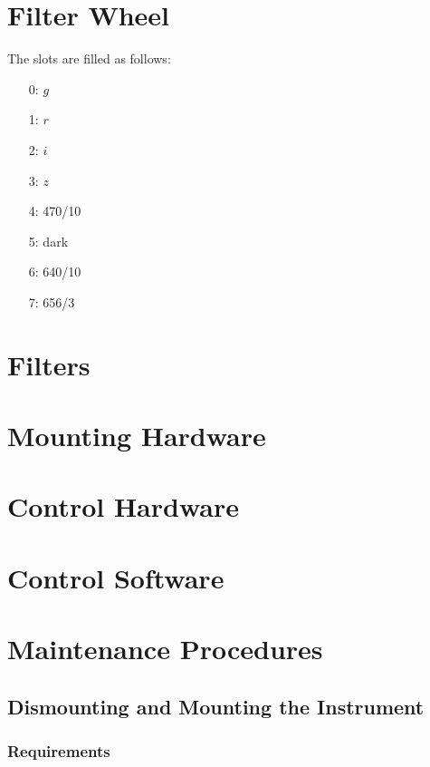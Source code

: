 \section{Filter Wheel}

The slots are filled as follows:
    \begin{enumerate}
        \item[0:] $g$
        \item[1:] $r$
        \item[2:] $i$
        \item[3:] $z$
        \item[4:] 470/10
        \item[5:] dark
        \item[6:] 640/10
        \item[7:] 656/3
    \end{enumerate}
    
\section{Filters}


\section{Mounting Hardware}

\section{Control Hardware}

\section{Control Software}

\section{Maintenance Procedures}

\subsection{Dismounting and Mounting the Instrument}
\label{section:huitzi-dismounting-and-mounting}

\subsubsection{Requirements}


